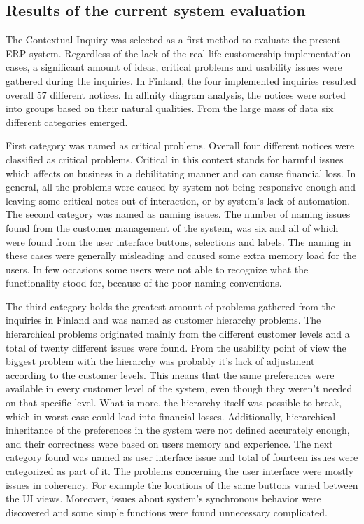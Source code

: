 \documentclass[12pt,a4paper,oneside,pdftex]{report}
\begin{document}
\subsection{Results of the current system evaluation}

The Contextual Inquiry was selected as a first method to evaluate the present ERP system. Regardless of the lack of the real-life customership implementation cases, a significant amount of ideas, critical problems and usability issues were gathered during the inquiries. 
In Finland, the four implemented inquiries resulted overall 57 different notices. In affinity diagram analysis, the notices were sorted into groups based on their natural qualities. From the large mass of data six different categories emerged. 

First category was named as critical problems. Overall four different notices were classified as critical problems. Critical in this context stands for harmful issues which affects on business in a debilitating manner and can cause financial loss. In general, all the problems were caused by system not being responsive enough and leaving some critical notes out of interaction, or by system's lack of automation. The second category was named as naming issues. The number of naming issues found from the customer management of the system, was six and all of which were found from the user interface buttons, selections and labels. The naming in these cases were generally misleading and caused some extra memory load for the users. In few occasions some users were not able to recognize what the functionality stood for, because of the poor naming conventions. 

The third category holds the greatest amount of problems gathered from the inquiries in Finland and was named as customer hierarchy problems. The hierarchical problems originated mainly from the different customer levels and a total of twenty different issues were found. From the usability point of view the biggest problem with the hierarchy was probably it's lack of adjustment according to the customer levels. This means that the same preferences were available in every customer level of the system, even though they weren't needed on that specific level. What is more, the hierarchy itself was possible to break, which in worst case could lead into financial losses. Additionally, hierarchical inheritance of the preferences in the system were not defined accurately enough, and their correctness were based on users memory and experience. The next category found was named as user interface issue and total of fourteen issues were categorized as part of it. The problems concerning the user interface were mostly issues in coherency. For example the locations of the same buttons varied between the UI views. Moreover, issues about system's synchronous behavior were discovered and some simple functions were found unnecessary complicated.
\end{document}

